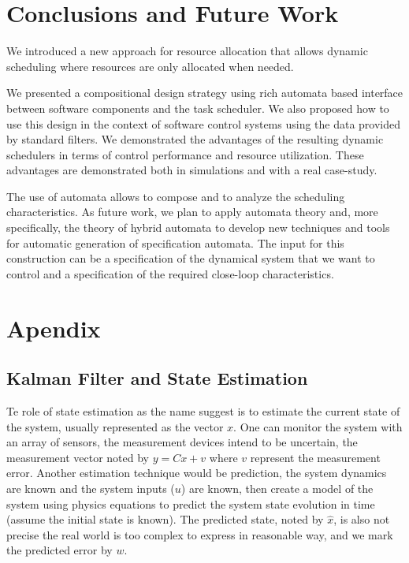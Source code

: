 \documentclass[ twoside, 12pt ]{article}
\begin{document}

\section{Conclusions and Future Work}

We introduced a new approach for resource allocation that allows dynamic scheduling where resources are only allocated when needed.

We presented a compositional design strategy using rich automata based interface between software components and the task scheduler. We also proposed how to use this design in the context of software control systems using the data provided by standard filters.
We demonstrated the advantages of the resulting dynamic schedulers in terms of control performance and resource utilization. These advantages are demonstrated both in simulations and with a real case-study.

The use of automata allows to compose and to analyze the scheduling characteristics. As future work, we plan to apply automata theory and, more specifically, the theory of hybrid automata to develop new techniques and tools for automatic generation of specification automata. The input for this construction can be a specification of the dynamical system that we want to control and a specification of the required close-loop characteristics. 


\section{Apendix}
\subsection{Kalman Filter and State Estimation}
\label{sec:kalman}
Te role of state estimation as the name suggest is to estimate the current state of the system, usually represented as the vector $x$.
One can monitor the system with an array of sensors, the measurement devices intend to be uncertain, the measurement vector noted by $y=Cx+v$ where $v$ represent the measurement error.
Another estimation technique would be prediction, the system dynamics are known and the system inputs ($u$) are known, then create a model of the system using physics equations to predict the system state evolution in time (assume the initial state is known).
The predicted state, noted by $\hat{x}$, is also not precise the real world is too complex to express in reasonable way, and we mark the predicted error by $w$.
\end{document}
